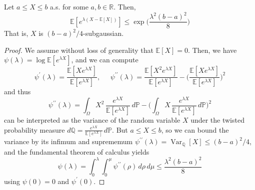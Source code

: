 \documentclass{article}
\DeclareMathOperator{\Var}{Var}
\begin{document}
  \begin{lemma}
  Let $a \leq X \leq b$ a.s. for some $a, b \in \mathbb{R}$. Then, 
  \[\mathbb{E}[e^{\lambda(X - \mathbb{E}[X])}] \leq \exp \bigg( \frac{\lambda^2 (b - a)^2}{8} \bigg)\]
  That is, $X$ is $(b-a)^2 /4$-subgaussian. 
  \end{lemma}
  \begin{proof}
  We assume without loss of generality that $\mathbb{E}[X] = 0$. Then, we have $\psi(\lambda) = \log \mathbb{E}[ e^{\lambda X}]$, and we can compute 
  \[\psi^\prime (\lambda) = \frac{\mathbb{E}[X e^{\lambda X}]}{\mathbb{E}[e^{\lambda X}]}, \;\;\;\;\; \psi^{\prime\prime} (\lambda) = \frac{\mathbb{E}[X^2 e^{\lambda X}]}{\mathbb{E}[e^{\lambda X}]} - \bigg( \frac{\mathbb{E}[X e^{\lambda X}]}{\mathbb{E}[e^{\lambda X}]} \bigg)^2\]
  and thus 
  \[\psi^{\prime\prime} (\lambda) = \int_\Omega X^2 \, \frac{e^{\lambda X}}{\mathbb{E}[e^{\lambda X}]} \,d\mathbb{P} - \bigg( \int_\Omega X \, \frac{e^{\lambda X}}{\mathbb{E}[e^{\lambda X}]} \,d\mathbb{P} \bigg)^2 \] 
  can be interpreted as the variance of the random variable $X$ under the twisted probability measure $d\mathbb{Q} = \frac{e^{\lambda X}}{\mathbb{E}[e^{\lambda X}]} \,d\mathbb{P}$. But $a \leq X \leq b$, so we can bound the variance by its infimum and suprememum $\psi^{\prime\prime} (\lambda) = \Var_\mathbb{Q} [X] \leq (b-a)^2 / 4$, and the fundamental theorem of calculus yields 
  \[\psi(\lambda) = \int_0^\lambda \int_0^\mu \psi^{\prime\prime} (\rho) \, d\rho \, d\mu \leq \frac{\lambda^2 (b - a)^2}{8}\]
  using $\psi(0) = 0$ and $\psi^\prime (0)$. 
  \end{proof}
\end{document}
